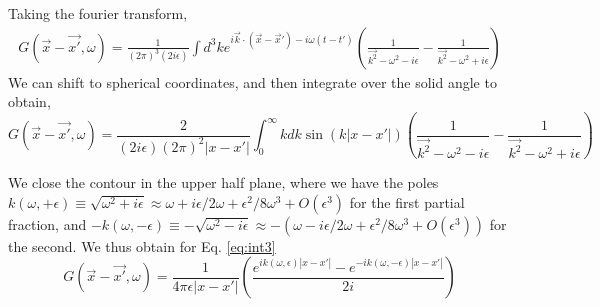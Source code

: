 \documentclass[aps,preprintnumbers,superscriptaddress,longbibliography]{revtex4-1}
\begin{document}
Taking the fourier transform, 
\begin{align} G(\vec{x}-\vec{x'},\omega)=
    \frac{1}{ (2\pi)^3(2i\epsilon) }\int d^3ke^{i\vec{k}\cdot(\vec{x}-\vec{x}')-i\omega (t-t')}(\frac{1}{\vec{k^2}-\omega^2-i\epsilon}-\frac{1}{\vec{k^2}-\omega^2+i\epsilon})
\end{align}
We can shift to spherical coordinates, and then integrate over the solid angle to obtain,
\begin{equation}
   G(\vec{x}-\vec{x'},\omega)=\frac{2}{(2i\epsilon)(2\pi)^2|x-x'|}\int_0^{\infty} k dk \sin\left({k|x-x'|}\right)(\frac{1}{\vec{k^2}-\omega^2-i\epsilon}-\frac{1}{\vec{k^2}-\omega^2+i\epsilon})
\end{equation}


We close the contour in the upper half plane, where we have the poles $k(\omega,+\epsilon)\equiv\sqrt{\omega^2+i\epsilon}\approx \omega+i\epsilon/2\omega+\epsilon^2/8\omega^3 + O(\epsilon^3)$ for the first partial fraction, and $-k(\omega,-\epsilon)\equiv-\sqrt{\omega^2-i\epsilon}\approx-\left( \omega-i\epsilon/2\omega+\epsilon^2/8\omega^3 + O(\epsilon^3)\right)$ for the second. We thus obtain
for Eq. \eqref{eq:int3}
\begin{equation}
    G(\vec{x}-\vec{x'},\omega)=\frac{1}{4\pi \epsilon|x-x'|}\left(\frac{e^{ik(\omega,\epsilon)|x-x'|}-e^{-ik(\omega,-\epsilon)|x-x'|}}{2i}\right)
    \label{eq:withEpsilon}
\end{equation}
\end{document}
